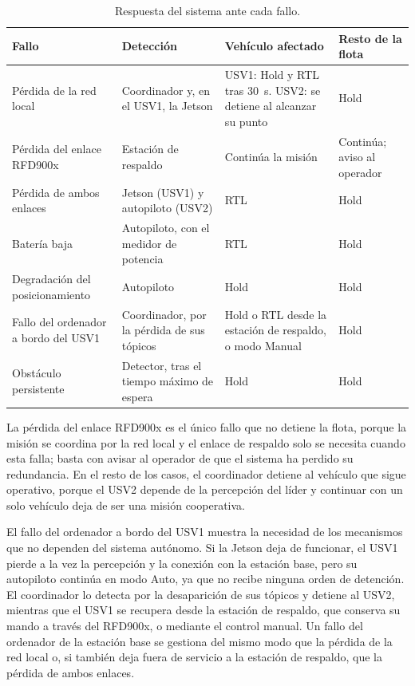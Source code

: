 \begin{table}[!htb]
\centering
\caption{Respuesta del sistema ante cada fallo.}
\label{tab:respuesta_fallos}
\small
\begin{tabularx}{\textwidth}{|>{\raggedright\arraybackslash}p{3.1cm}|>{\raggedright\arraybackslash}p{3.0cm}|>{\raggedright\arraybackslash}X|>{\raggedright\arraybackslash}p{2.8cm}|}
\hline
\textbf{Fallo} & \textbf{Detección} & \textbf{Vehículo afectado} & \textbf{Resto de la flota} \\ \hline
Pérdida de la red local & Coordinador y, en el USV1, la Jetson & USV1: Hold y RTL tras 30~s. USV2: se detiene al alcanzar su punto & Hold \\ \hline
Pérdida del enlace RFD900x & Estación de respaldo & Continúa la misión & Continúa; aviso al operador \\ \hline
Pérdida de ambos enlaces & Jetson (USV1) y autopiloto (USV2) & RTL & Hold \\ \hline
Batería baja & Autopiloto, con el medidor de potencia & RTL & Hold \\ \hline
Degradación del posicionamiento & Autopiloto & Hold & Hold \\ \hline
Fallo del ordenador a bordo del USV1 & Coordinador, por la pérdida de sus tópicos & Hold o RTL desde la estación de respaldo, o modo Manual & Hold \\ \hline
Obstáculo persistente & Detector, tras el tiempo máximo de espera & Hold & Hold \\ \hline
\end{tabularx}
\end{table}

La pérdida del enlace RFD900x es el único fallo que no detiene la flota, porque la misión se coordina por la red local y el enlace de respaldo solo se necesita cuando esta falla; basta con avisar al operador de que el sistema ha perdido su redundancia. En el resto de los casos, el coordinador detiene al vehículo que sigue operativo, porque el USV2 depende de la percepción del líder y continuar con un solo vehículo deja de ser una misión cooperativa.

El fallo del ordenador a bordo del USV1 muestra la necesidad de los mecanismos que no dependen del sistema autónomo. Si la Jetson deja de funcionar, el USV1 pierde a la vez la percepción y la conexión con la estación base, pero su autopiloto continúa en modo Auto, ya que no recibe ninguna orden de detención. El coordinador lo detecta por la desaparición de sus tópicos y detiene al USV2, mientras que el USV1 se recupera desde la estación de respaldo, que conserva su mando a través del RFD900x, o mediante el control manual. Un fallo del ordenador de la estación base se gestiona del mismo modo que la pérdida de la red local o, si también deja fuera de servicio a la estación de respaldo, que la pérdida de ambos enlaces.

